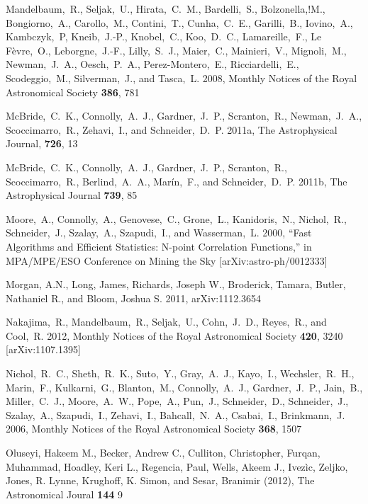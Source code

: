 \documentclass[useAMS,usenatbib,tightenlines,11pt,preprint]{aastex}
\begin{document}
\begin{thebibliography}{99}
Mandelbaum,~R., Seljak,~U., Hirata,~C.~M., Bardelli,~S., Bolzonella,!M.,
Bongiorno,~A., Carollo,~M., Contini,~T., Cunha,~C.~E., Garilli,~B.,
Iovino,~A., Kambczyk,~P, Kneib,~J.-P., Knobel,~C., Koo,~D.~C., Lamareille,~F.,
Le F\`evre,~O., Leborgne,~J.-F., Lilly,~S.~J., Maier,~C., Mainieri,~V.,
Mignoli,~M., Newman,~J.~A., Oesch,~P.~A., Perez-Montero,~E., Ricciardelli,~E.,
Scodeggio,~M., Silverman,~J., and Tasca,~L. 2008, Monthly Notices of the Royal
Astronomical Society {\bf 386}, 781

McBride,~C.~K., Connolly,~A.~J., Gardner,~J.~P., Scranton,~R., Newman,~J.~A.,
Scoccimarro,~R., Zehavi,~I., and Schneider,~D.~P. 2011a, The Astrophysical
Journal, {\bf 726}, 13

McBride,~C.~K., Connolly,~A.~J., Gardner,~J.~P., Scranton,~R., Scoccimarro,~R.,
Berlind,~A.~A., Mar\'in,~F., and Schneider,~D.~P. 2011b, The Astrophysical
Journal {\bf 739}, 85

Moore,~A., Connolly,~A., Genovese,~C., Grone,~L., Kanidoris,~N., Nichol,~R.,
Schneider,~J., Szalay,~A., Szapudi,~I., and Wasserman,~L. 2000,
``Fast Algorithms and Efficient Statistics: N-point Correlation Functions,'' in
MPA/MPE/ESO Conference on Mining the Sky [arXiv:astro-ph/0012333]

Morgan, A.N., Long, James, Richards, Joseph W., Broderick, Tamara, Butler,
Nathaniel R., and Bloom, Joshua S. 2011, arXiv:1112.3654

Nakajima,~R., Mandelbaum,~R., Seljak,~U., Cohn,~J.~D., Reyes,~R., and
Cool,~R. 2012, Monthly Notices of the Royal Astronomical Society {\bf 420}, 3240
[arXiv:1107.1395]

Nichol,~R.~C., Sheth,~R.~K., Suto,~Y., Gray,~A.~J., Kayo,~I., Wechsler,~R.~H.,
Marin,~F., Kulkarni,~G., Blanton,~M., Connolly,~A.~J., Gardner,~J.~P., Jain,~B.,
Miller,~C.~J., Moore,~A.~W., Pope,~A., Pun,~J., Schneider,~D., Schneider,~J.,
Szalay,~A., Szapudi,~I., Zehavi,~I., Bahcall,~N.~A., Csabai,~I., Brinkmann,~J.
2006, Monthly Notices of the Royal Astronomical Society {\bf 368}, 1507

Oluseyi, Hakeem M., Becker, Andrew C., Culliton, Christopher, Furqan, Muhammad,
Hoadley, Keri L., Regencia, Paul, Wells, Akeem J., Ivez\`ic, Zeljko, Jones, R.
Lynne, Krughoff, K. Simon, and Sesar, Branimir (2012), The Astronomical Joural
{\bf 144} 9


\end{thebibliography}
\end{document}
